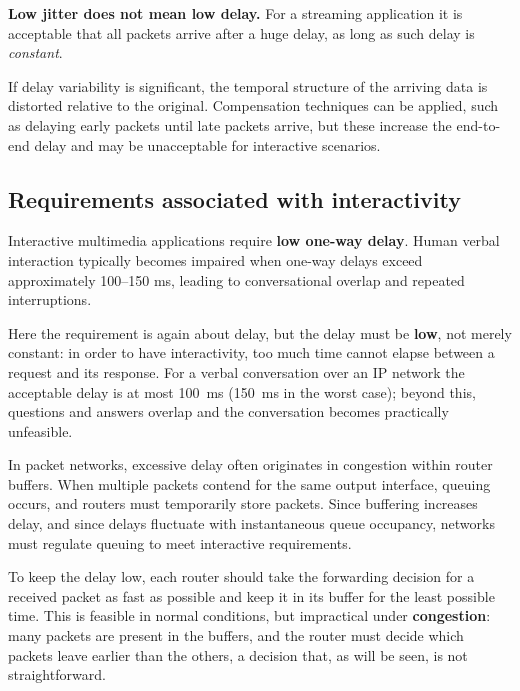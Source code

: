 \begin{notebox}
	\textbf{Low jitter does not mean low delay.} For a streaming application it is acceptable that all packets arrive after a huge delay, as long as such delay is \emph{constant}.
\end{notebox}

\begin{center}
\end{center}


If delay variability is significant, the temporal structure of the arriving data is distorted relative to the original. Compensation techniques can be applied, such as delaying early packets until late packets arrive, but these increase the end-to-end delay and may be unacceptable for interactive scenarios.

\subsection{Requirements associated with interactivity}

Interactive multimedia applications require \textbf{low one-way delay}. Human verbal interaction typically becomes impaired when one-way delays exceed approximately 100--150 ms, leading to conversational overlap and repeated interruptions.

Here the requirement is again about delay, but the delay must be \textbf{low}, not merely constant: in order to have interactivity, too much time cannot elapse between a request and its response. For a verbal conversation over an IP network the acceptable delay is at most 100~ms (150~ms in the worst case); beyond this, questions and answers overlap and the conversation becomes practically unfeasible.

In packet networks, excessive delay often originates in congestion within router buffers. When multiple packets contend for the same output interface, queuing occurs, and routers must temporarily store packets. Since buffering increases delay, and since delays fluctuate with instantaneous queue occupancy, networks must regulate queuing to meet interactive requirements.

To keep the delay low, each router should take the forwarding decision for a received packet as fast as possible and keep it in its buffer for the least possible time. This is feasible in normal conditions, but impractical under \textbf{congestion}: many packets are present in the buffers, and the router must decide which packets leave earlier than the others, a decision that, as will be seen, is not straightforward.

